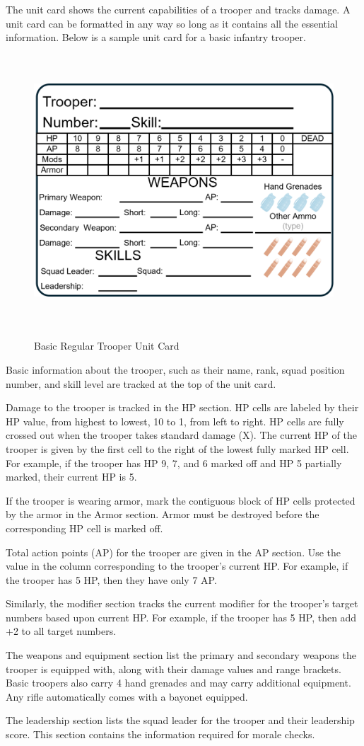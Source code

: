The unit card shows the current capabilities of a trooper and tracks damage.
A unit card can be formatted in any way so long as it contains all the essential information.
Below is a sample unit card for a basic infantry trooper.

\begin{figure}[!h]
  \centering
  \includegraphics[alt='Sample Regular Trooper', width=5.63in, height=4in]{img/RegularTrooper.png}
  \caption*{Basic Regular Trooper Unit Card}
\end{figure}

Basic information about the trooper, such as their name, rank, squad position number, and skill level are tracked at the top of the unit card.

Damage to the trooper is tracked in the HP section.
HP cells are labeled by their HP value, from highest to lowest, 10 to 1, from left to right.
HP cells are fully crossed out when the trooper takes standard damage (X).
The current HP of the trooper is given by the first cell to the right of the lowest fully marked HP cell.
For example, if the trooper has HP 9, 7, and 6 marked off and HP 5 partially marked, their current HP is 5.

If the trooper is wearing armor, mark the contiguous block of HP cells protected by the armor in the Armor section.
Armor must be destroyed before the corresponding HP cell is marked off.

Total action points (AP) for the trooper are given in the AP section.
Use the value in the column corresponding to the trooper's current HP.
For example, if the trooper has 5 HP, then they have only 7 AP.

Similarly, the modifier section tracks the current modifier for the trooper's target numbers based upon current HP.
For example, if the trooper has 5 HP, then add +2 to all target numbers.

The weapons and equipment section list the primary and secondary weapons the trooper is equipped with, along with their damage values and range brackets.
Basic troopers also carry 4 hand grenades and may carry additional equipment.
Any rifle automatically comes with a bayonet equipped.

The leadership section lists the squad leader for the trooper and their leadership score.
This section contains the information required for morale checks.
